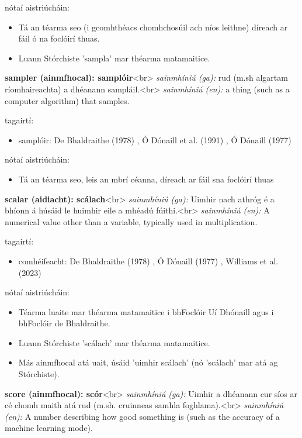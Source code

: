 \documentclass{article}
\begin{document}
nótaí aistriúcháin:
\begin{itemize}
	\item Tá an téarma seo (i gcomhthéacs chomhchosúil ach níos leithne) díreach ar fáil ó na foclóirí thuas.
	\item Luann Stórchiste 'sampla' mar théarma matamaitice.
\end{itemize}


\textbf{sampler (ainmfhocal): samplóir}<br>
\textit{sainmhíniú (ga):} rud (m.sh algartam ríomhaireachta) a dhéanann sampláil.<br>
\textit{sainmhíniú (en):} a thing (such as a computer algorithm) that samples.

tagairtí:
\begin{itemize}
	\item samplóir: De Bhaldraithe (1978) \cite{de-bhaldraithe}, Ó Dónaill et al. (1991) \cite{focloir-beag}, Ó Dónaill (1977) \cite{odonaill}
\end{itemize}

nótaí aistriúcháin:
\begin{itemize}
	\item Tá an téarma seo, leis an mbrí céanna, díreach ar fáil sna foclóirí thuas
\end{itemize}


\textbf{scalar (aidiacht): scálach}<br>
\textit{sainmhíniú (ga):} Uimhir nach athróg é a bhíonn á húsáid le huimhir eile a mhéadú fúithi.<br>
\textit{sainmhíniú (en):} A numerical value other than a variable, typically used in multiplication.

tagairtí:
\begin{itemize}
	\item comhéifeacht: De Bhaldraithe (1978) \cite{de-bhaldraithe}, Ó Dónaill (1977) \cite{odonaill}, Williams et al. (2023) \cite{storchiste}
\end{itemize}

nótaí aistriúcháin:
\begin{itemize}
	\item Téarma luaite mar théarma matamaitice i bhFoclóir Uí Dhónaill agus i bhFoclóir de Bhaldraithe.
	\item Luann Stórchiste 'scálach' mar théarma matamaitice.
	\item Más ainmfhocal atá uait, úsáid 'uimhir scálach' (nó 'scálach' mar atá ag Stórchiste).
\end{itemize}


\textbf{score (ainmfhocal): scór}<br>
\textit{sainmhíniú (ga):} Uimhir a dhéanann cur síos ar cé chomh maith atá rud (m.sh. cruinneas samhla foghlama).<br>
\textit{sainmhíniú (en):} A number describing how good something is (such as the accuracy of a machine learning mode).
\end{document}
